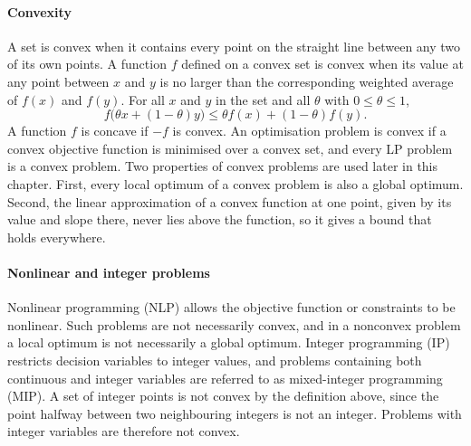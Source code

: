 \paragraph{Convexity}
A set is convex when it contains every point on the straight line between any two of its own points. A function $f$ defined on a convex set is convex when its value at any point between $x$ and $y$ is no larger than the corresponding weighted average of $f(x)$ and $f(y)$. For all $x$ and $y$ in the set and all $\theta$ with $0\le\theta\le 1$,
\begin{equation}
f\bigl(\theta x+(1-\theta)y\bigr)\le\theta f(x)+(1-\theta)f(y).
\label{eq:convex_function}
\end{equation}
A function $f$ is concave if $-f$ is convex. %
An optimisation problem is convex if a convex objective function is minimised over a convex set, and every LP problem is a convex problem. %
Two properties of convex problems are used later in this chapter. First, every local optimum of a convex problem is also a global optimum. %
Second, the linear approximation of a convex function at one point, given by its value and slope there, never lies above the function, so it gives a bound that holds everywhere. %

\paragraph{Nonlinear and integer problems}
Nonlinear programming (NLP) allows the objective function or constraints to be nonlinear. Such problems are not necessarily convex, and in a nonconvex problem a local optimum is not necessarily a global optimum. %
Integer programming (IP) restricts decision variables to integer values, and problems containing both continuous and integer variables are referred to as mixed-integer programming (MIP). A set of integer points is not convex by the definition above, since the point halfway between two neighbouring integers is not an integer. Problems with integer variables are therefore not convex. %

